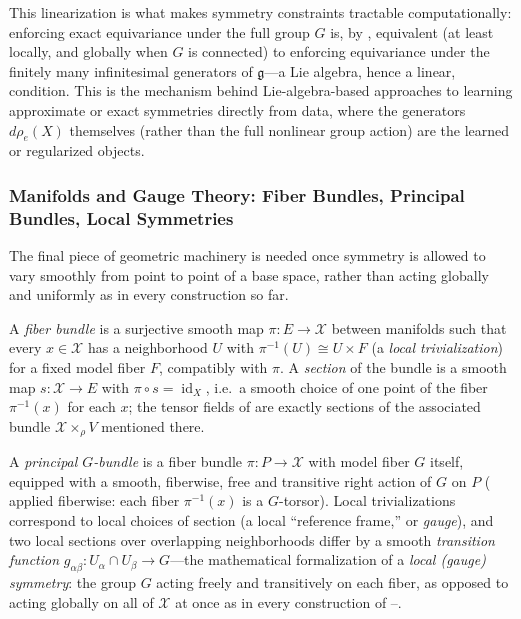 \documentclass[mathematics,review,submit,moreauthors]{Definitions/mdpi}
\begin{document}
This linearization is what makes symmetry constraints tractable
computationally: enforcing exact equivariance under the full group $G$ is,
by , equivalent (at least
locally, and globally when $G$ is connected) to enforcing equivariance under
the finitely many infinitesimal generators of $\mathfrak{g}$---a Lie
algebra, hence a linear, condition. This is the mechanism behind
Lie-algebra-based approaches to learning approximate or exact symmetries
directly from data, where the generators $d\rho_e(X)$ themselves (rather
than the full nonlinear group action) are the learned or regularized
objects.

\subsubsection{Manifolds and Gauge Theory: Fiber Bundles, Principal Bundles, Local Symmetries}
\label{subsec:manifold-gauge-theory}

The final piece of geometric machinery is needed once symmetry is allowed to
vary smoothly from point to point of a base space, rather than acting
globally and uniformly as in every construction so far.

\begin{Definition}
\label{def:fiber-bundle}
A \emph{fiber bundle} is a surjective smooth map $\pi : E \to \mathcal{X}$ between
manifolds such that every $x \in \mathcal{X}$ has a neighborhood $U$ with
$\pi^{-1}(U) \cong U \times F$ (a \emph{local trivialization}) for a fixed
model fiber $F$, compatibly with $\pi$. A \emph{section} of the bundle is a
smooth map $s : \mathcal{X} \to E$ with $\pi \circ s = \operatorname{id}_X$, i.e.\ a smooth
choice of one point of the fiber $\pi^{-1}(x)$ for each $x$; the tensor
fields of  are exactly sections of the
associated bundle $\mathcal{X} \times_\rho V$ mentioned there.
\end{Definition}

\begin{Definition}
\label{def:principal-bundle}
A \emph{principal $G$-bundle} is a fiber bundle $\pi : P \to \mathcal{X}$ with model
fiber $G$ itself, equipped with a smooth, fiberwise, free and transitive
right action of $G$ on $P$ ( applied
fiberwise: each fiber $\pi^{-1}(x)$ is a $G$-torsor). Local
trivializations correspond to local choices of section (a local ``reference
frame,'' or \emph{gauge}), and two local sections over overlapping
neighborhoods differ by a smooth \emph{transition function} $g_{\alpha\beta}
: U_\alpha \cap U_\beta \to G$---the mathematical formalization of a
\emph{local (gauge) symmetry}: the group $G$ acting freely and transitively
on each fiber, as opposed to acting globally on all of $\mathcal{X}$ at once as in
every construction of --.
\end{Definition}
\end{document}
